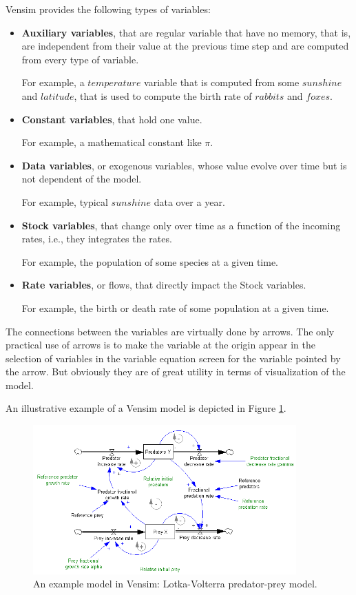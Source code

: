 Vensim provides the following types of variables:
\begin{itemize}
    \item \textbf{Auxiliary variables}, that are regular variable that have no memory, that is, are independent from their value at the previous time step and are computed from every type of variable.

    For example, a $temperature$ variable that is computed from some $sunshine$ and $latitude$, that is used to compute the birth rate of $rabbits$ and $foxes$.

    \item \textbf{Constant variables}, that hold one value.
    
    For example, a mathematical constant like $\pi$.

    \item \textbf{Data variables}, or exogenous variables, whose value evolve over time but is not dependent of the model.

    For example, typical $sunshine$ data over a year.

    \item \textbf{Stock variables}, that change only over time as a function of the incoming rates, i.e., they integrates the rates.

    For example, the population of some species at a given time.

    \item \textbf{Rate variables}, or flows, that directly impact the Stock variables. 

    For example, the birth or death rate of some population at a given time.
\end{itemize}

The connections between the variables are virtually done by arrows. The only practical use of arrows is to make the variable at the origin appear in the selection of variables in the variable equation screen for the variable pointed by the arrow. But obviously they are of great utility in terms of visualization of the model.

An illustrative example of a Vensim model is depicted in Figure \ref{fig:vensim-model-example}.

\begin{figure}[h!]
    \includegraphics[width=0.9\textwidth]{resources/images/vensim-model-example.png}
    \caption{An example model in Vensim: Lotka-Volterra predator-prey model.}
    \label{fig:vensim-model-example}
\end{figure}